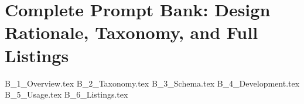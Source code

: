 \section{Complete Prompt Bank: Design Rationale, Taxonomy, and Full Listings}
\label{app:prompts}
\label{app:prompt_bank}  %

{B_1_Overview.tex}
{B_2_Taxonomy.tex}
{B_3_Schema.tex}
{B_4_Development.tex}
{B_5_Usage.tex}
{B_6_Listings.tex}
